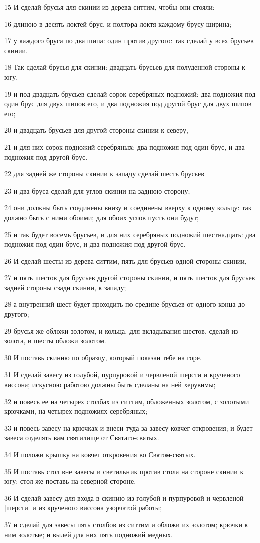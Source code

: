 \par 15 И сделай брусья для скинии из дерева ситтим, чтобы они стояли:
\par 16 длиною в десять локтей брус, и полтора локтя каждому брусу ширина;
\par 17 у каждого бруса по два шипа: один против другого: так сделай у всех брусьев скинии.
\par 18 Так сделай брусья для скинии: двадцать брусьев для полуденной стороны к югу,
\par 19 и под двадцать брусьев сделай сорок серебряных подножий: два подножия под один брус для двух шипов его, и два подножия под другой брус для двух шипов его;
\par 20 и двадцать брусьев для другой стороны скинии к северу,
\par 21 и для них сорок подножий серебряных: два подножия под один брус, и два подножия под другой брус.
\par 22 для задней же стороны скинии к западу сделай шесть брусьев
\par 23 и два бруса сделай для углов скинии на заднюю сторону;
\par 24 они должны быть соединены внизу и соединены вверху к одному кольцу: так должно быть с ними обоими; для обоих углов пусть они будут;
\par 25 и так будет восемь брусьев, и для них серебряных подножий шестнадцать: два подножия под один брус, и два подножия под другой брус.
\par 26 И сделай шесты из дерева ситтим, пять для брусьев одной стороны скинии,
\par 27 и пять шестов для брусьев другой стороны скинии, и пять шестов для брусьев задней стороны сзади скинии, к западу;
\par 28 а внутренний шест будет проходить по средине брусьев от одного конца до другого;
\par 29 брусья же обложи золотом, и кольца, для вкладывания шестов, сделай из золота, и шесты обложи золотом.
\par 30 И поставь скинию по образцу, который показан тебе на горе.
\par 31 И сделай завесу из голубой, пурпуровой и червленой шерсти и крученого виссона; искусною работою должны быть сделаны на ней херувимы;
\par 32 и повесь ее на четырех столбах из ситтим, обложенных золотом, с золотыми крючками, на четырех подножиях серебряных;
\par 33 и повесь завесу на крючках и внеси туда за завесу ковчег откровения; и будет завеса отделять вам святилище от Святаго-святых.
\par 34 И положи крышку на ковчег откровения во Святом-святых.
\par 35 И поставь стол вне завесы и светильник против стола на стороне скинии к югу; стол же поставь на северной стороне.
\par 36 И сделай завесу для входа в скинию из голубой и пурпуровой и червленой [шерсти] и из крученого виссона узорчатой работы;
\par 37 и сделай для завесы пять столбов из ситтим и обложи их золотом; крючки к ним золотые; и вылей для них пять подножий медных.

